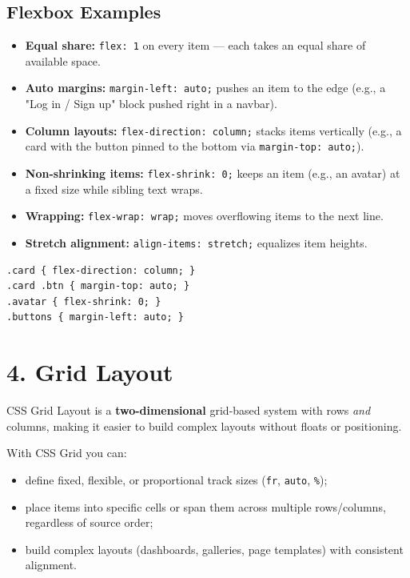 \documentclass[12pt]{article}
\begin{document}
\subsection{Flexbox Examples}
\begin{itemize}
    \item \textbf{Equal share:} \texttt{flex: 1} on every item — each takes an equal share of available space.
    \item \textbf{Auto margins:} \texttt{margin-left: auto;} pushes an item to the edge (e.g., a "Log in / Sign up" block pushed right in a navbar).
    \item \textbf{Column layouts:} \texttt{flex-direction: column;} stacks items vertically (e.g., a card with the button pinned to the bottom via \texttt{margin-top: auto;}).
    \item \textbf{Non-shrinking items:} \texttt{flex-shrink: 0;} keeps an item (e.g., an avatar) at a fixed size while sibling text wraps.
    \item \textbf{Wrapping:} \texttt{flex-wrap: wrap;} moves overflowing items to the next line.
    \item \textbf{Stretch alignment:} \texttt{align-items: stretch;} equalizes item heights.
\end{itemize}
\begin{lstlisting}
.card { flex-direction: column; }
.card .btn { margin-top: auto; }
.avatar { flex-shrink: 0; }
.buttons { margin-left: auto; }
\end{lstlisting}

\section{4. Grid Layout}
CSS Grid Layout is a \textbf{two-dimensional} grid-based system with rows \emph{and} columns, making it easier to build complex layouts without floats or positioning.

With CSS Grid you can:
\begin{itemize}
    \item define fixed, flexible, or proportional track sizes (\texttt{fr}, \texttt{auto}, \texttt{\%});
    \item place items into specific cells or span them across multiple rows/columns, regardless of source order;
    \item build complex layouts (dashboards, galleries, page templates) with consistent alignment.
\end{itemize}
\end{document}
